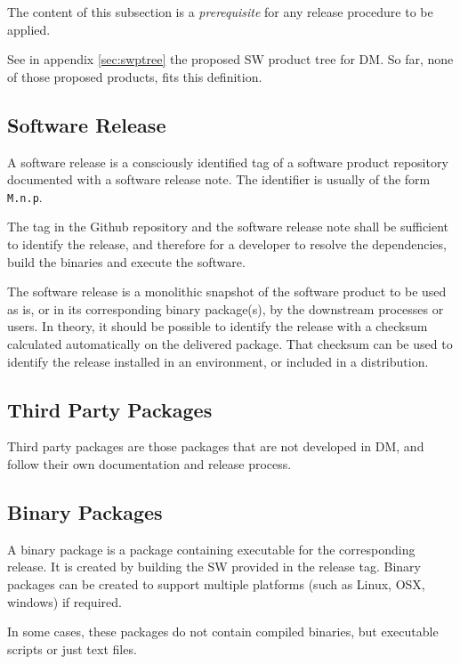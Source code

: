 The content of this subsection is a \textit{prerequisite} for any release procedure to be applied.

See in appendix \ref{sec:swptree} the proposed \gls{SW} product tree for \gls{DM}. So far, none of those proposed products, fits this definition.


\subsection{Software Release} \label{sec:defrelease}

A software release is a consciously identified tag of a software product repository documented with a software release note.
The identifier is usually of the form \texttt{M.n.p}.

The tag in the Github repository and the software release note shall be sufficient to identify the release, and therefore for a developer
to resolve the dependencies, build the binaries and execute the software.

The software release is a monolithic snapshot of the software product to be used as is, or in its corresponding binary package(s), by the downstream processes or users.
In theory, it should be possible to identify the release with a checksum calculated automatically on the delivered package.
That checksum can be used to identify the release installed in an environment, or included in a distribution.


\subsection{Third Party Packages}

Third party packages are those packages that are not developed in \gls{DM}, and follow their own documentation and release process.


\subsection{Binary Packages} \label{sec:swbpkg}

A binary package is a package containing executable for the corresponding release.
It is created by building the \gls{SW} provided in the release tag.
Binary packages can be created to support multiple platforms (such as Linux, \gls{OSX}, windows) if required.

In some cases, these packages do not contain compiled binaries, but executable scripts or just text files.


